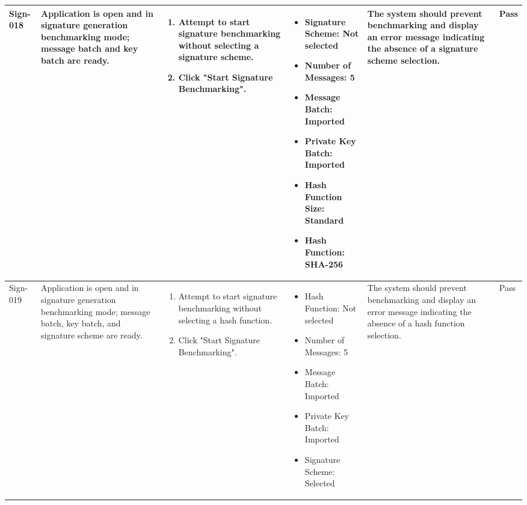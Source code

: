 \documentclass[]{final_report}
\theoremstyle{definition}
\begin{document}
\begin{longtable}{|l|p{2.5cm}|p{2.8cm}|p{3cm}|p{2cm}|p{1.5cm}|}
  Sign-018 & Application is open and in signature generation benchmarking mode; message batch and key batch are ready. &
  \begin{enumerate}
    \item Attempt to start signature benchmarking without selecting a signature scheme.
    \item Click "Start Signature Benchmarking".
  \end{enumerate} & 
  \begin{itemize}
    \item Signature Scheme: Not selected
    \item Number of Messages: 5
    \item Message Batch: Imported
    \item Private Key Batch: Imported
    \item Hash Function Size: Standard
    \item Hash Function: SHA-256
  \end{itemize} &
  The system should prevent benchmarking and display an error message indicating the absence of a signature scheme selection. & Pass \\
  \hline

  Sign-019 & Application is open and in signature generation benchmarking mode; message batch, key batch, and signature scheme are ready. &
  \begin{enumerate}
    \item Attempt to start signature benchmarking without selecting a hash function.
    \item Click "Start Signature Benchmarking".
  \end{enumerate} & 
  \begin{itemize}
    \item Hash Function: Not selected
    \item Number of Messages: 5
    \item Message Batch: Imported
    \item Private Key Batch: Imported
    \item Signature Scheme: Selected
  \end{itemize} &
  The system should prevent benchmarking and display an error message indicating the absence of a hash function selection. & Pass \\
  \hline


\end{longtable}
\end{document}

